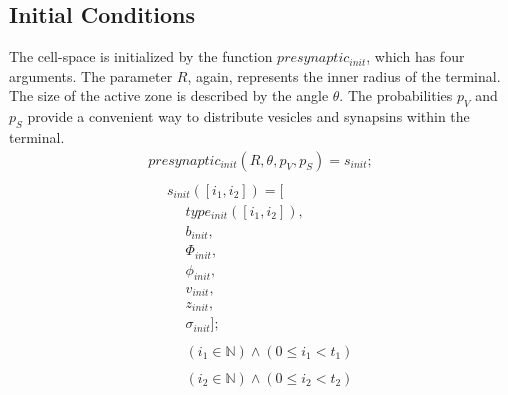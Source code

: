 \documentclass{acm_proc_article-sp}
\begin{document}
\subsection{Initial Conditions}
The cell-space is initialized by the function $presynaptic_{init}$,
which has four arguments.  The parameter $R$, again, represents the 
inner radius of the terminal.  The size of the active zone is described
by the angle $\theta$.  The probabilities $p_V$ and $p_S$ provide a 
convenient way to distribute vesicles and synapsins within the terminal.
\begin{displaymath} \begin{array}{l}
presynaptic_{init}(R, \theta, p_V, p_S) = s_{init}; \\
\\
\hspace{16pt} s_{init}([i_1, i_2]) = [\\
\hspace{16pt} \hspace{16pt} type_{init}([i_1, i_2]), \\
\hspace{16pt} \hspace{16pt} b_{init}, \\
\hspace{16pt} \hspace{16pt} \Phi_{init}, \\
\hspace{16pt} \hspace{16pt} \phi_{init}, \\
\hspace{16pt} \hspace{16pt} v_{init}, \\
\hspace{16pt} \hspace{16pt} z_{init}, \\
\hspace{16pt} \hspace{16pt} \sigma_{init}]; \\
\\
\hspace{16pt} \hspace{16pt} (i_1 \in \mathbb{N}) \wedge (0 \le i_1 < t_1) \\
\\
\hspace{16pt} \hspace{16pt} (i_2 \in \mathbb{N}) \wedge (0 \le i_2 < t_2)
\end{array} \end{displaymath}
\end{document}
